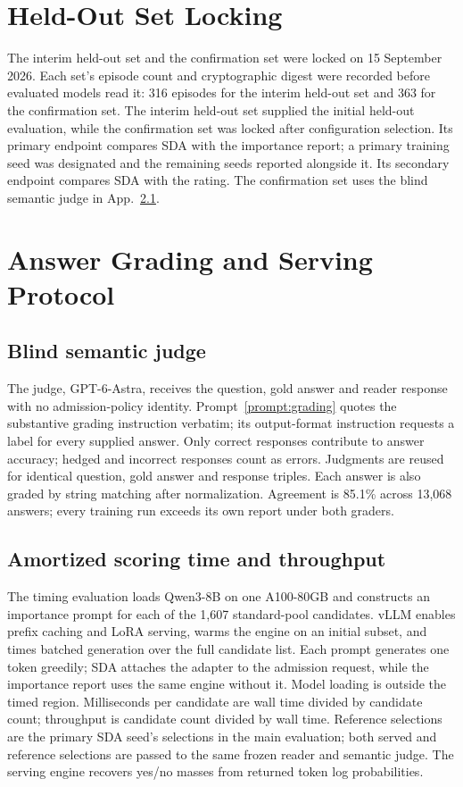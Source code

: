 \section{Held-Out Set Locking}
\label{app:freeze}

The interim held-out set and the confirmation set were locked on
15 September 2026. Each set's episode count and cryptographic digest
were recorded before evaluated models read it: 316 episodes for the
interim held-out set and 363 for the confirmation set. The interim
held-out set supplied the initial held-out evaluation, while the
confirmation set was locked after configuration selection. Its primary
endpoint compares SDA with the importance report; a primary training
seed was designated and the remaining seeds reported alongside it.
Its secondary endpoint compares SDA with the rating. The confirmation
set uses the blind semantic judge in App.~\ref{app:judge}.

\section{Answer Grading and Serving Protocol}
\label{app:repro}

\subsection{Blind semantic judge}
\label{app:judge}

The judge, GPT-6-Astra, receives the question, gold answer and reader
response with no admission-policy identity. Prompt~\ref{prompt:grading}
quotes the substantive grading instruction verbatim; its output-format
instruction requests a label for every supplied answer.
Only correct responses contribute to answer accuracy; hedged and
incorrect responses count as errors. Judgments are reused for identical
question, gold answer and response triples. Each answer is also graded
by string matching after normalization. Agreement is 85.1\% across
13,068 answers; every training run exceeds its own report under both
graders.

\subsection{Amortized scoring time and throughput}
\label{app:timing}

The timing evaluation loads Qwen3-8B on one A100-80GB and constructs an
importance prompt for each of the 1,607 standard-pool candidates. vLLM
enables prefix caching and LoRA serving, warms the engine on an initial
subset, and times batched generation over the full candidate list.
Each prompt generates one token greedily; SDA attaches the adapter to
the admission request, while the importance report uses the same engine
without it. Model loading is outside the timed region. Milliseconds per
candidate are wall time divided by candidate count; throughput is
candidate count divided by wall time. Reference selections are the
primary SDA seed's selections in the main evaluation; both served and
reference selections are passed to the same frozen reader and semantic
judge. The serving engine recovers yes/no masses from returned token
log probabilities.

